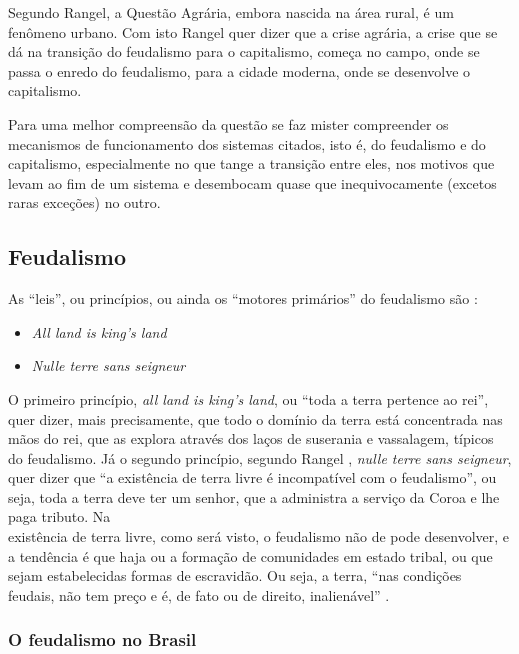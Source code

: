 \documentclass[
	12pt,				%
	oneside,			%
	a4paper,			%
	chapter=TITLE,		%
	section=TITLE,		%
	english,			%
	brazil				%
	]{abntex2}
\begin{document}
Segundo Rangel, a Questão Agrária, embora nascida na área rural, é um fenômeno
urbano. Com isto Rangel quer dizer que a crise agrária, a crise que se dá na
transição do feudalismo para o capitalismo, começa no campo, onde se passa o
enredo do feudalismo, para a cidade moderna, onde se desenvolve o capitalismo.

Para uma melhor compreensão da questão se faz mister compreender os mecanismos
de funcionamento dos sistemas citados, isto é, do feudalismo e do capitalismo,
especialmente no que tange a transição entre eles, nos motivos que levam ao
fim de um sistema e desembocam quase que inequivocamente (excetos raras
exceções) no outro.

\hypertarget{feudalismo}{%
\subsection{Feudalismo}\label{feudalismo}}

As ``leis'', ou princípios, ou ainda os ``motores primários'' do feudalismo são
\autocite[126]{rangel1985}:
\begin{itemize}
\tightlist
\item
  \emph{All land is king's land}
\item
  \emph{Nulle terre sans seigneur}
\end{itemize}
O primeiro princípio, \emph{all land is king's land}, ou ``toda a terra pertence ao
rei'', quer dizer, mais precisamente, que todo o domínio da terra está
concentrada nas mãos do rei, que as explora através dos laços de suserania e
vassalagem, típicos do feudalismo. Já o segundo princípio, segundo Rangel
\autocite*[219]{rangel1961}, \emph{nulle terre sans seigneur}, quer dizer que ``a existência
de terra livre é incompatível com o feudalismo'', ou seja, toda a terra deve
ter um senhor, que a administra a serviço da Coroa e lhe paga tributo. Na\\
existência de terra livre, como será visto, o feudalismo não de pode desenvolver,
e a tendência é que haja ou a formação de comunidades em estado tribal, ou que
sejam estabelecidas formas de escravidão. Ou seja, a terra, ``nas condições
feudais, não tem preço e é, de fato ou de direito, inalienável'' \autocite[206]{rangel1960}.

\hypertarget{o-feudalismo-no-brasil}{%
\subsubsection{O feudalismo no Brasil}\label{o-feudalismo-no-brasil}}
\end{document}
